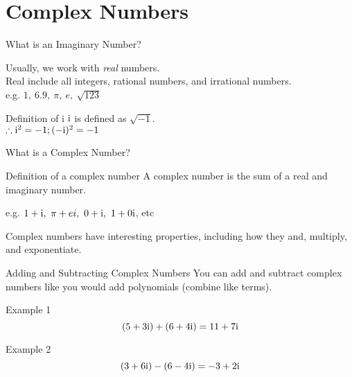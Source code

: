 \section{Complex Numbers}
\begin{namedframe}{What is an Imaginary Number?}
	\begin{center}
		Usually, we work with \textit{real} numbers. \\
		Real include all integers, rational numbers, and irrational numbers. \\
		e.g. $1,\ 6.9,\ \pi,\ e,\ \sqrt{123}$
	\end{center}

	\begin{block}{Definition of i}
		$\mathrm{i}$ is defined as $\sqrt{-1}$. \\
		$\therefore \mathrm{i}^2 = -1; (-\mathrm{i})^2 = -1$
	\end{block}
\end{namedframe}

\begin{namedframe}{What is a Complex Number?}
	\begin{block}{Definition of a complex number}
		A complex number is the sum of a real and imaginary number.
	\end{block}

	\begin{center}
		e.g. $1 + \imagi,\ \pi + ei,\ 0 + \imagi,\ 1 + 0\imagi$, etc
	\end{center}

	Complex numbers have interesting properties, including how
	they and, multiply, and exponentiate.
\end{namedframe}

\begin{namedframe}{Adding and Subtracting Complex Numbers}
	You can add and subtract complex numbers like you would add polynomials (combine like terms).
	\begin{exampleblock}{Example 1}
		\[(5 + 3\mathrm{i}) + (6 + 4\mathrm{i}) = 11 + 7\mathrm{i}\]
	\end{exampleblock}

	\begin{exampleblock}{Example 2}
		\[(3 + 6\mathrm{i}) - (6 - 4\mathrm{i}) = -3 + 2\mathrm{i}\]
	\end{exampleblock}
\end{namedframe}

